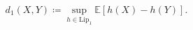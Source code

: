 \begin{equation}\label{eq:wasserstein_definition}
    d_1 \left(X, Y \right) \coloneqq \sup_{h \in \mathrm{Lip_1}} \mathbb{E}[h(X) - h(Y)] .
\end{equation}
